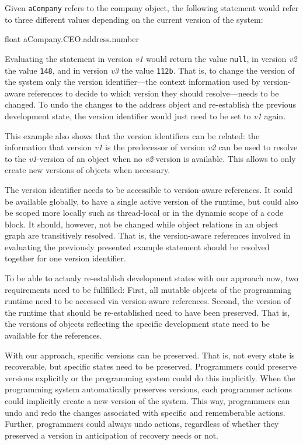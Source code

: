 Given \lstinline{aCompany} refers to the company object, the following statement would refer to three different values depending on the current version of the system:

\begin{code}{}{float}
aCompany.CEO.address.number
\end{code}
\iffalse
\end{verbatim}\fi

Evaluating the statement in version \emph{v1} would return the value \lstinline{null}, in version \emph{v2} the value \lstinline{148}, and in version \emph{v3} the value \lstinline{112b}.
That is, to change the version of the system only the version identifier---the context information used by version-aware references to decide to which version they should resolve---needs to be changed.
To undo the changes to the address object and re-establish the previous development state, the version identifier would just need to be set to \emph{v1} again.

This example also shows that the version identifiers can be related: the information that version \emph{v1} is the predecessor of version \emph{v2} can be used to resolve to the \emph{v1}-version of an object when no \emph{v2}-version is available.
This allows to only create new versions of objects when necessary.

The version identifier needs to be accessible to version-aware references.
It could be available globally, to have a single active version of the runtime, but could also be scoped more locally such as thread-local or in the dynamic scope of a code block.
It should, however, not be changed while object relations in an object graph are transitively resolved.
That is, the version-aware references involved in evaluating the previously presented example statement should be resolved together for one version identifier.

To be able to actualy re-establish development states with our approach now, two requirements need to be fullfilled:
First, all mutable objects of the programming runtime need to be accessed via version-aware references.
Second, the version of the runtime that should be re-established need to have been preserved.
That is, the versions of objects reflecting the specific development state need to be available for the references.

With our approach, specific versions can be preserved.
That is, not every state is recoverable, but specific states need to be preserved.
Programmers could preserve versions explicitly or the programming system could do this implicitly.
When the programming system automatically preserves versions, each programmer actions could implicitly create a new version of the system.
This way, programmers can undo and redo the changes associated with specific and rememberable actions.
Further, programmers could always undo actions, regardless of whether they preserved a version in anticipation of recovery needs or not.



